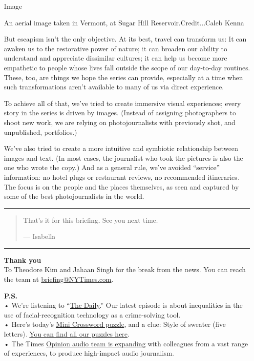Image

An aerial image taken in Vermont, at Sugar Hill Reservoir.Credit...Caleb
Kenna

But escapism isn't the only objective. At its best, travel can transform
us: It can awaken us to the restorative power of nature; it can broaden
our ability to understand and appreciate dissimilar cultures; it can
help us become more empathetic to people whose lives fall outside the
scope of our day-to-day routines. These, too, are things we hope the
series can provide, especially at a time when such transformations
aren't available to many of us via direct experience.

To achieve all of that, we've tried to create immersive visual
experiences; every story in the series is driven by images. (Instead of
assigning photographers to shoot new work, we are relying on
photojournalists with previously shot, and unpublished, portfolios.)

We've also tried to create a more intuitive and symbiotic relationship
between images and text. (In most cases, the journalist who took the
pictures is also the one who wrote the copy.) And as a general rule,
we've avoided ``service'' information: no hotel plugs or restaurant
reviews, no recommended itineraries. The focus is on the people and the
places themselves, as seen and captured by some of the best
photojournalists in the world.

\begin{center}\rule{0.5\linewidth}{\linethickness}\end{center}

\begin{quote}
That's it for this briefing. See you next time.

--- Isabella
\end{quote}

\begin{center}\rule{0.5\linewidth}{\linethickness}\end{center}

\textbf{Thank you}\\
To Theodore Kim and Jahaan Singh for the break from the news. You can
reach the team at
\href{mailto:briefing+midnight@NYTimes.com?subject=Briefing\%20Feedback}{briefing@NYTimes.com}.

\textbf{P.S.}\\
• We're listening to
``\href{https://www.nytimes3xbfgragh.onion/thedaily}{The Daily}.'' Our
latest episode is about inequalities in the use of facial-recognition
technology as a crime-solving tool.\\
• Here's today's
\href{https://www.nytimes3xbfgragh.onion/crosswords/game/mini}{Mini
Crossword puzzle}, and a clue: Style of sweater (five letters).
\href{https://www.nytimes3xbfgragh.onion/crosswords}{You can find all
our puzzles here}.\\
• The Times
\href{https://www.nytco.com/press/introducing-the-opinion-audio-team/}{Opinion
audio team is expanding} with colleagues from a vast range of
experiences, to produce high-impact audio journalism.

